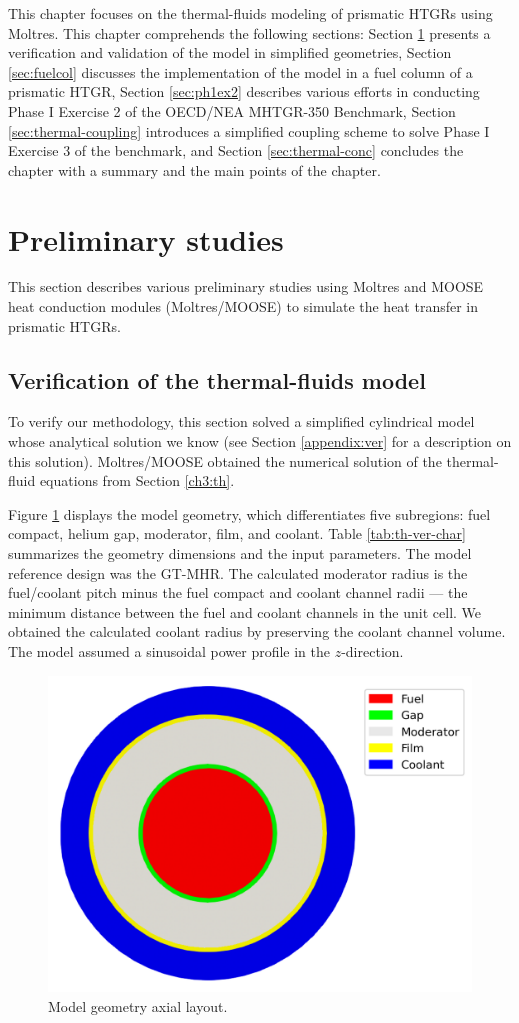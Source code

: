 \label{ch:thermalfluids}

This chapter focuses on the thermal-fluids modeling of prismatic HTGRs using Moltres.
This chapter comprehends the following sections: 
Section \ref{sec:thermal-prelim} presents a verification and validation of the model in simplified geometries,
Section \ref{sec:fuelcol} discusses the implementation of the model in a fuel column of a prismatic HTGR,
Section \ref{sec:ph1ex2} describes various efforts in conducting Phase I Exercise 2 of the OECD/NEA MHTGR-350 Benchmark, 
Section \ref{sec:thermal-coupling} introduces a simplified coupling scheme to solve Phase I Exercise 3 of the benchmark,
and Section \ref{sec:thermal-conc} concludes the chapter with a summary and the main points of the chapter.

\section{Preliminary studies}
\label{sec:thermal-prelim}

This section describes various preliminary studies using Moltres and MOOSE heat conduction modules (Moltres/MOOSE) to simulate the heat transfer in prismatic HTGRs.

\subsection{Verification of the thermal-fluids model}

To verify our methodology, this section solved a simplified cylindrical model whose analytical solution we know (see Section \ref{appendix:ver} for a description on this solution).
Moltres/MOOSE obtained the numerical solution of the thermal-fluid equations from Section \ref{ch3:th}.

Figure \ref{fig:th-ver-mesh} displays the model geometry, which differentiates five subregions: fuel compact, helium gap, moderator, film, and coolant.
Table \ref{tab:th-ver-char} summarizes the geometry dimensions and the input parameters.
The model reference design was the GT-MHR.
The calculated moderator radius is the fuel/coolant pitch minus the fuel compact and coolant channel radii --- the minimum distance between the fuel and coolant channels in the unit cell.
We obtained the calculated coolant radius by preserving the coolant channel volume.
The model assumed a sinusoidal power profile in the $z$-direction.

\begin{figure}[htbp!]
	\centering
	\includegraphics[width=0.40\linewidth]{figures-thermal/ver-mesh2}
	\hfill
	\caption{Model geometry axial layout.}
	\label{fig:th-ver-mesh}
\end{figure}

